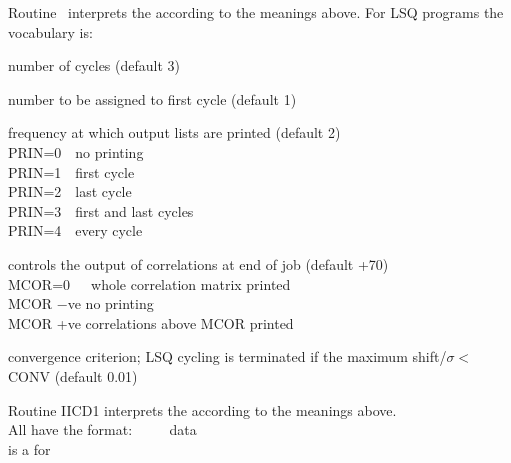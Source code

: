 Routine \ interprets the  according to the meanings above.
\p\ms
For LSQ programs the vocabulary is:\\[0.1ex]
\begin{list} {} {\setlength{\labelwidth}{2.5cm}
  \setlength{\parsep}{-1ex}
  \setlength{\leftmargin}{\labelwidth}
 \addtolength{\leftmargin}{0.5cm}}
\item[\bd{NCYC} \hfill] number of cycles (default 3)
\item[\bd{CYC1} \hfill] number to be assigned to first cycle (default 1)
\item[\bd{PRIN} \hfill] frequency at which output lists are printed (default 2)\\ 
PRIN=0\ \ no printing\\
PRIN=1\ \ first cycle\\
PRIN=2\ \ last cycle\\
PRIN=3\ \ first and last cycles\\
PRIN=4\ \ every cycle
\item[\bd{MCOR} \hfill] controls the output of correlations at end of job
 (default +70)\\
MCOR=0\ \ \ whole correlation matrix printed\\
MCOR $-$ve no printing\\
MCOR +ve correlations above MCOR printed
\item[\bd{CONV} \hfill] convergence criterion; LSQ cycling is terminated if
the maximum shift/$\sigma <$ CONV (default 0.01)
\end{list}
\p
Routine IICD1 interprets the  according to the meanings above.\\[1ex] 
\cardend\newpage
{}
%
All  have the format:  
\  \ \cw\ \ data\\[1ex]
 is a \scat for 
